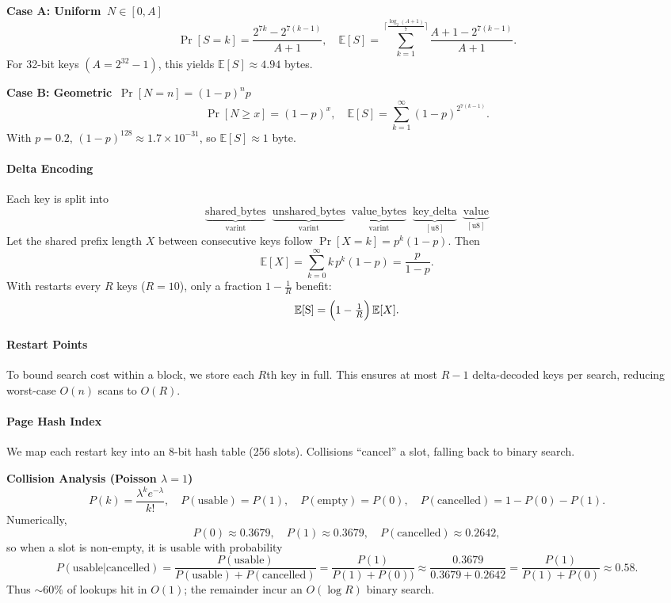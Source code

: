 \documentclass[10pt]{article}
\begin{document}
\textbf{Case A: Uniform \(\,N\in[0,A]\)}
\[
\Pr[S = k]
= \frac{2^{7k} - 2^{7(k-1)}}{A+1},
\quad
\mathbb{E}[S]
= \sum_{k=1}^{\lceil\frac{\log_2(A+1)}{7}\rceil}
  \frac{A+1 - 2^{7(k-1)}}{A+1}.
\]
For 32-bit keys \((A=2^{32}-1)\), this yields \(\mathbb{E}[S]\approx4.94\) bytes.

\textbf{Case B: Geometric \(\, \Pr[N=n]=(1-p)^n p\)}
\[
\Pr[N\ge x] = (1-p)^x,\quad
\mathbb{E}[S] = \sum_{k=1}^\infty (1-p)^{2^{7(k-1)}}.
\]
With \(p=0.2\), \((1-p)^{128}\approx1.7\times10^{-31}\), so \(\mathbb{E}[S]\approx1\) byte.

\paragraph{Delta Encoding}
Each key is split into
\[
\underbrace{\text{shared\_bytes}}_{\text{varint}}
\;\;
\underbrace{\text{unshared\_bytes}}_{\text{varint}}
\;\;
\underbrace{\text{value\_bytes}}_{\text{varint}}
\;\;
\underbrace{\text{key\_delta}}_{[\text{u8}]}
\;\;
\underbrace{\text{value}}_{[\text{u8}]}
\]
Let the shared prefix length \(X\) between consecutive keys follow
\(\Pr[X=k]=p^k(1-p)\).  Then
\[
\mathbb{E}[X] = \sum_{k=0}^\infty k\,p^k(1-p) = \frac{p}{1-p}.
\]
With restarts every \(R\) keys (\(R=10\)), only a fraction \(1-\tfrac1R\) benefit:
\[
\mathbb{E}[\text{S}] = \Bigl(1 - \tfrac1R\Bigr)\,\mathbb{E}[X].
\]

\paragraph{Restart Points}
To bound search cost within a block, we store each \(R\)th key in full.  This ensures
at most \(R-1\) delta-decoded keys per search, reducing worst-case \(O(n)\) scans to \(O(R)\).

\paragraph{Page Hash Index}
We map each restart key into an 8-bit hash table (256 slots).  Collisions “cancel” a slot, falling back to binary search.

\textbf{Collision Analysis (Poisson \(\lambda=1\))}
\[
P(k) = \frac{\lambda^k e^{-\lambda}}{k!},\quad
P(\text{usable}) = P(1),\quad
P(\text{empty}) = P(0),\quad
P(\text{cancelled}) = 1 - P(0) - P(1).
\]
Numerically,
\[
P(0)\approx0.3679,\quad
P(1)\approx0.3679,\quad
P(\text{cancelled})\approx0.2642,
\]
so when a slot is non-empty, it is usable with probability
\[
P(\text{usable}|\text{cancelled}) = \frac{P(\text{usable})}{P(\text{usable}) + P(\text{cancelled})}
= \frac{P(1)}{P(1) + P(0))} \approx \frac{0.3679}{0.3679 + 0.2642} = \frac{P(1)}{P(1) + P(0)} \approx 0.58.
\]
Thus \(\sim60\%\) of lookups hit in \(O(1)\); the remainder incur an \(O(\log R)\) binary search.
\end{document}
